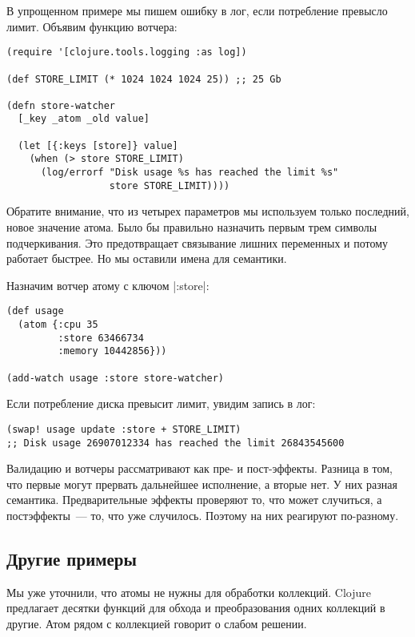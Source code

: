 В упрощенном примере мы пишем ошибку в лог, если потребление превысло
лимит. Объявим функцию вотчера:

\begin{verbatim}
(require '[clojure.tools.logging :as log])

(def STORE_LIMIT (* 1024 1024 1024 25)) ;; 25 Gb

(defn store-watcher
  [_key _atom _old value]

  (let [{:keys [store]} value]
    (when (> store STORE_LIMIT)
      (log/errorf "Disk usage %s has reached the limit %s"
                  store STORE_LIMIT))))
\end{verbatim}

Обратите внимание, что из четырех параметров мы используем только последний,
новое значение атома. Было бы правильно назначить первым трем символы
подчеркивания. Это предотвращает связывание лишних переменных и потому работает
быстрее. Но мы оставили имена для семантики.

Назначим вотчер атому с ключом \spverb|:store|:

\begin{verbatim}
(def usage
  (atom {:cpu 35
         :store 63466734
         :memory 10442856}))

(add-watch usage :store store-watcher)
\end{verbatim}

Если потребление диска превысит лимит, увидим запись в лог:

\begin{verbatim}
(swap! usage update :store + STORE_LIMIT)
;; Disk usage 26907012334 has reached the limit 26843545600
\end{verbatim}

Валидацию и вотчеры рассматривают как пре- и пост-эффекты. Разница в том, что
первые могут прервать дальнейшее исполнение, а вторые нет. У них разная
семантика. Предварительные эффекты проверяют то, что может случиться, а
постэффекты~--- то, что уже случилось. Поэтому на них реагируют по-разному.

\subsection{Другие примеры}

Мы уже уточнили, что атомы не нужны для обработки коллекций. Clojure предлагает
десятки функций для обхода и преобразования одних коллекций в другие. Атом рядом
с коллекцией говорит о слабом решении.

